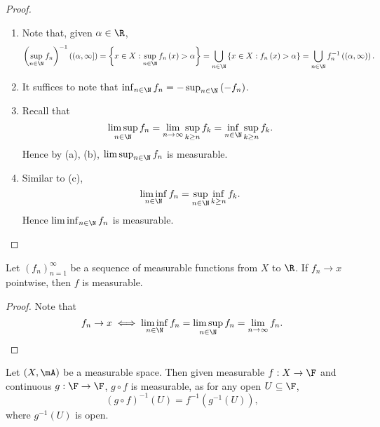 \documentclass[pmath451]{subfiles}
\begin{document}
    \begin{proof}
        \begin{enumerate}
            \item Note that, given $\alpha\in\R$,
                \begin{equation*}
                    \left( \sup_{n\in\N}f_n \right)^{-1}\left( \left( \alpha,\infty \right] \right) = \left\lbrace x\in X: \sup_{n\in\N}f_n\left( x \right)>\alpha \right\rbrace = \bigcup^{}_{n\in\N} \left\lbrace x\in X: f_n\left( x \right)>\alpha \right\rbrace = \bigcup^{}_{n\in\N} f_n^{-1}\left( \left( \alpha,\infty \right) \right).
                \end{equation*}

            \item It suffices to note that $\inf_{n\in\N}f_n = -\sup_{n\in\N}\left( -f_n \right)$.

            \item Recall that
                \begin{equation*}
                    \limsup_{n\in\N} f_n = \lim_{n\to\infty} \sup_{k\geq n} f_k = \inf_{n\in\N}\sup_{k\geq n} f_k.
                \end{equation*}
                Hence by (a), (b), $\limsup_{n\in\N}f_n$ is measurable.

            \item Similar to (c),
                \begin{equation*}
                    \liminf_{n\in\N}f_n = \sup_{n\in\N}\inf_{k\geq n}f_k.
                \end{equation*}
                Hence $\liminf_{n\in\N}f_n$ is measurable.
        \end{enumerate}
    \end{proof}

    \begin{cor}{}
        Let $\left( f_{n} \right)^{\infty}_{n=1}$ be a sequence of measurable functions from $X$ to $\R$. If $f_n\to x$ pointwise, then $f$ is measurable.
    \end{cor}	

    \begin{proof}
        Note that
        \begin{equation*}
            f_n\to x \iff \liminf_{n\in\N}f_n = \limsup_{n\in\N}f_n = \lim_{n\to\infty} f_n.
        \end{equation*}
    \end{proof}
    
    \np Let $\left( X,\mA \right)$ be a measurable space. Then given measurable $f:X\to\F$ and continuous $g:\F\to\F$, $g\circ f$ is measurable, as for any open $U\subseteq\F$,
    \begin{equation*}
        \left( g\circ f \right)^{-1}\left( U \right) = f^{-1}\left( g^{-1}\left( U \right) \right),
    \end{equation*}
    where $g^{-1}\left( U \right)$ is open.
\end{document}
